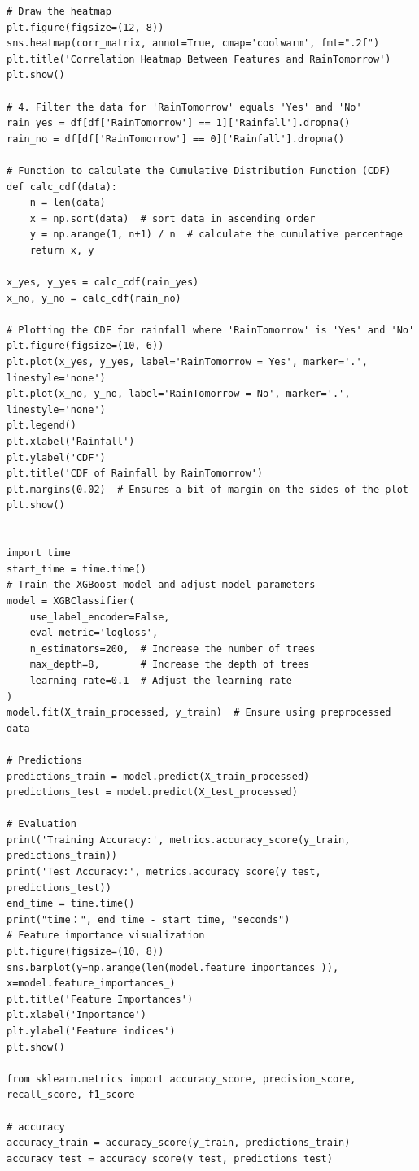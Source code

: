 \documentclass[12pt]{article}
\begin{document}
\begin{verbatim}
# Draw the heatmap
plt.figure(figsize=(12, 8))
sns.heatmap(corr_matrix, annot=True, cmap='coolwarm', fmt=".2f")
plt.title('Correlation Heatmap Between Features and RainTomorrow')
plt.show()

# 4. Filter the data for 'RainTomorrow' equals 'Yes' and 'No'
rain_yes = df[df['RainTomorrow'] == 1]['Rainfall'].dropna()
rain_no = df[df['RainTomorrow'] == 0]['Rainfall'].dropna()

# Function to calculate the Cumulative Distribution Function (CDF)
def calc_cdf(data):
    n = len(data)
    x = np.sort(data)  # sort data in ascending order
    y = np.arange(1, n+1) / n  # calculate the cumulative percentage
    return x, y

x_yes, y_yes = calc_cdf(rain_yes)
x_no, y_no = calc_cdf(rain_no)

# Plotting the CDF for rainfall where 'RainTomorrow' is 'Yes' and 'No'
plt.figure(figsize=(10, 6))
plt.plot(x_yes, y_yes, label='RainTomorrow = Yes', marker='.', linestyle='none')
plt.plot(x_no, y_no, label='RainTomorrow = No', marker='.', linestyle='none')
plt.legend()
plt.xlabel('Rainfall')
plt.ylabel('CDF')
plt.title('CDF of Rainfall by RainTomorrow')
plt.margins(0.02)  # Ensures a bit of margin on the sides of the plot
plt.show()


import time
start_time = time.time()
# Train the XGBoost model and adjust model parameters
model = XGBClassifier(
    use_label_encoder=False, 
    eval_metric='logloss', 
    n_estimators=200,  # Increase the number of trees
    max_depth=8,       # Increase the depth of trees
    learning_rate=0.1  # Adjust the learning rate
)
model.fit(X_train_processed, y_train)  # Ensure using preprocessed data

# Predictions
predictions_train = model.predict(X_train_processed)
predictions_test = model.predict(X_test_processed)

# Evaluation
print('Training Accuracy:', metrics.accuracy_score(y_train, predictions_train))
print('Test Accuracy:', metrics.accuracy_score(y_test, predictions_test))
end_time = time.time()
print("time：", end_time - start_time, "seconds")
# Feature importance visualization
plt.figure(figsize=(10, 8))
sns.barplot(y=np.arange(len(model.feature_importances_)), x=model.feature_importances_)
plt.title('Feature Importances')
plt.xlabel('Importance')
plt.ylabel('Feature indices')
plt.show()

from sklearn.metrics import accuracy_score, precision_score, recall_score, f1_score

# accuracy
accuracy_train = accuracy_score(y_train, predictions_train)
accuracy_test = accuracy_score(y_test, predictions_test)


\end{verbatim}
\end{document}
